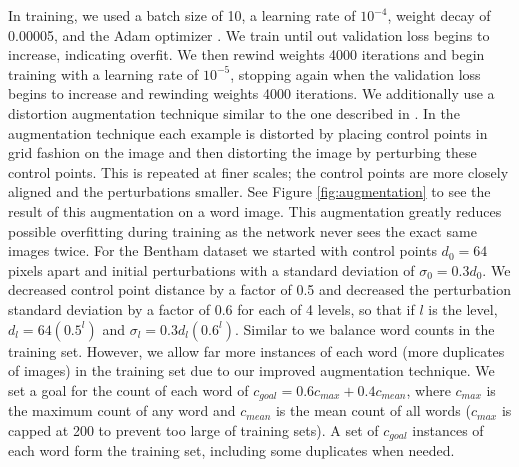 \documentclass[ms,electronic,twosidetoc,letterpaper,chaptercenter,parttop,lol,lof,lot]{byumsphd}
\begin{document}
In training, we used a batch size of 10, a learning rate of $10^{-4}$, weight decay of 0.00005, and the Adam optimizer \cite{adam}.
We train until out validation loss begins to increase, indicating overfit. We then rewind weights 4000 iterations
and begin training with a learning rate of $10^{-5}$, stopping again when the validation loss begins to increase and rewinding weights 4000 iterations.
We additionally use a distortion augmentation technique similar to the one described in \cite{wigington2017}. In the augmentation technique each example is distorted by placing control points in grid fashion on the image and then distorting the image by perturbing these control points. This is repeated at finer scales; the control points are more closely aligned and the perturbations smaller. See Figure \ref{fig:augmentation} to see the result of this augmentation on a word image. This augmentation greatly reduces possible overfitting during training as the network never sees the exact same images twice.
For the Bentham dataset we started with control points $d_0 = 64$ pixels apart and initial perturbations with a standard deviation of $\sigma_0 = 0.3 d_0$. We decreased control point distance by a factor of 0.5 and decreased the perturbation standard deviation by a factor of 0.6 for each of 4 levels, so that if $l$ is the level, $d_l = 64(0.5^{l})$ and $\sigma_l = 0.3 d_l (0.6^{l})$.
Similar to \cite{sudholt2016} we balance word counts in the training set. However, we allow far more instances of each word (more duplicates of images) in the training set due to our improved augmentation technique. We set a goal for the count of each word of $c_{goal} = 0.6c_{max}+0.4c_{mean}$, where $c_{max}$ is the maximum count of any word and $c_{mean}$ is the mean count of all words ($c_{max}$ is capped at 200 to prevent too large of training sets). A set of $c_{goal}$ instances of each word form the training set, including some duplicates when needed.
\end{document}
